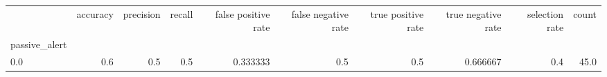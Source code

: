 \begin{tabular}{lrrrrrrrrr}
\toprule
{} &  accuracy &  precision &  recall &  false positive rate &  false negative rate &  true positive rate &  true negative rate &  selection rate &  count \\
passive\_alert &           &            &         &                      &                      &                     &                     &                 &        \\
\midrule
0.0           &       0.6 &        0.5 &     0.5 &             0.333333 &                  0.5 &                 0.5 &            0.666667 &             0.4 &   45.0 \\
\bottomrule
\end{tabular}
